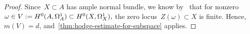 \documentclass[a4paper]{amsart}
\newcommand{\rH}{\textup{H}}
\theoremstyle{plain}
\theoremstyle{definition}
\numberwithin{equation}{section}
\begin{document}
\begin{proof} 
Since~$X\subset A$ has ample normal bundle, we know by~\cite[prop.~6.3.10(i)]{LazarsfeldPositivityII} that for nonzero 
%
$
\omega \in V := \rH^0(A, \Omega^1_A) \subset \rH^0(X, \Omega^1_X),
$
%
the zero locus~$Z(\omega) \subset X$ is finite. Hence,~$m(V)=d$, and~\cref{thm:hodge-estimate-for-subspace} applies.
\end{proof}


\small




\end{document}
